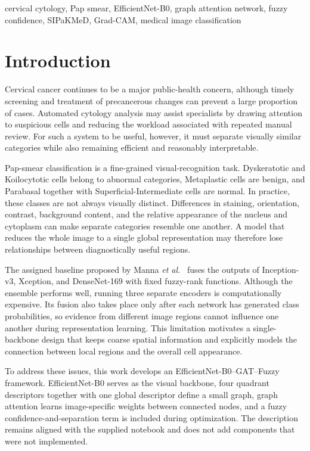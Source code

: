\documentclass[10pt,conference]{IEEEtran}
\begin{document}
\begin{IEEEkeywords}
cervical cytology, Pap smear, EfficientNet-B0, graph attention network, fuzzy confidence, SIPaKMeD, Grad-CAM, medical image classification
\end{IEEEkeywords}

\section{Introduction}

Cervical cancer continues to be a major public-health concern, although timely screening and treatment of precancerous changes can prevent a large proportion of cases. Automated cytology analysis may assist specialists by drawing attention to suspicious cells and reducing the workload associated with repeated manual review. For such a system to be useful, however, it must separate visually similar categories while also remaining efficient and reasonably interpretable.

Pap-smear classification is a fine-grained visual-recognition task. Dyskeratotic and Koilocytotic cells belong to abnormal categories, Metaplastic cells are benign, and Parabasal together with Superficial-Intermediate cells are normal. In practice, these classes are not always visually distinct. Differences in staining, orientation, contrast, background content, and the relative appearance of the nucleus and cytoplasm can make separate categories resemble one another. A model that reduces the whole image to a single global representation may therefore lose relationships between diagnostically useful regions.

The assigned baseline proposed by Manna \emph{et al.}~\cite{manna2021} fuses the outputs of Inception-v3, Xception, and DenseNet-169 with fixed fuzzy-rank functions. Although the ensemble performs well, running three separate encoders is computationally expensive. Its fusion also takes place only after each network has generated class probabilities, so evidence from different image regions cannot influence one another during representation learning. This limitation motivates a single-backbone design that keeps coarse spatial information and explicitly models the connection between local regions and the overall cell appearance.

To address these issues, this work develops an EfficientNet-B0--GAT--Fuzzy framework. EfficientNet-B0 serves as the visual backbone, four quadrant descriptors together with one global descriptor define a small graph, graph attention learns image-specific weights between connected nodes, and a fuzzy confidence-and-separation term is included during optimization. The description remains aligned with the supplied notebook and does not add components that were not implemented.
\end{document}
